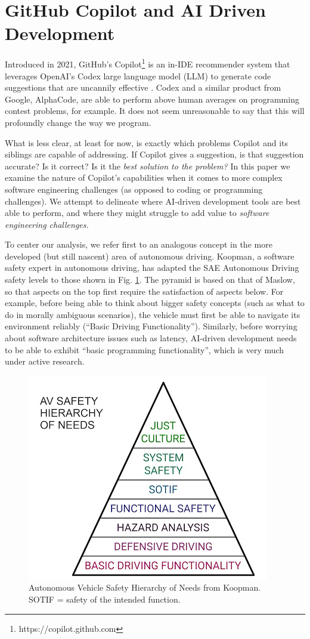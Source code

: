 \section{GitHub Copilot and AI Driven Development}
Introduced in 2021, GitHub's Copilot\footnote{https://copilot.github.com} is an in-IDE recommender system that leverages OpenAI's Codex \cite{copilot} large language model (LLM) to generate code suggestions that are uncannily effective \cite{copilot}. Codex and a similar product from Google, AlphaCode, are able to perform above human averages on programming contest problems, for example. It does not seem unreasonable to say that this will profoundly change the way we program.

What is less clear, at least for now, is exactly which problems Copilot and its siblings are capable of addressing. If Copilot gives a suggestion, is that suggestion accurate? Is it correct? Is it the \emph{best solution to the problem?} 
In this paper we examine the nature of Copilot's capabilities when it comes to more complex software engineering challenges (as opposed to coding or programming challenges). We attempt to delineate where AI-driven development tools are best able to perform, and where they might struggle to add value to \emph{software engineering challenges.}

To center our analysis, we refer first to an analogous concept in the more developed (but still nascent) area of autonomous driving. 
Koopman, a software safety expert in autonomous driving, has adapted the SAE Autonomous Driving safety levels \cite{sae} to those shown in Fig. \ref{fig:koopman_pyramid}. 
The pyramid is based on that of Maslow, so that aspects on the top first require the satisfaction of aspects below. 
For example, before being able to think about bigger safety concepts (such as what to do in morally ambiguous scenarios), the vehicle must first be able to navigate its environment reliably (``Basic Driving Functionality'').
Similarly, before worrying about software architecture issues such as latency, AI-driven development needs to be able to exhibit ``basic programming functionality'', which is very much under active research.

\begin{figure}
    \centering
    \includegraphics[width=.5\linewidth]{Figures/koopman_pyramid.jpeg}
    \caption{Autonomous Vehicle Safety Hierarchy of Needs from Koopman\cite{koopman}. SOTIF = safety of the intended function.}
    \label{fig:koopman_pyramid}
\end{figure}
